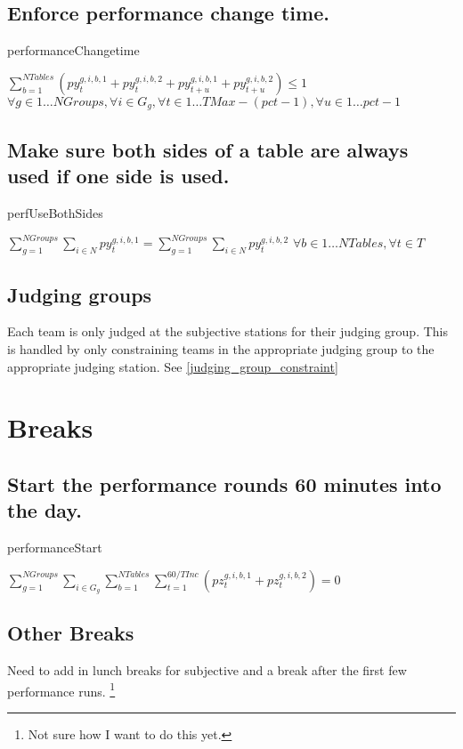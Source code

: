 \documentclass[letterpaper,11pt]{report}
\newcommand{\doccomment}[3]%
{\marginpar{\textcolor{#2}{\bf #1}}%
\footnote{{\color{#2}#3}}%
}
\newcommand{\doccomment}[3]{}
\newcommand{\jpscomment}[1]%
{\doccomment{SCHEWE}{Bittersweet}{#1}}
\begin{document}
\FloatBarrier
\subsection{Enforce performance change time.}
\begin{algorithm}
\caption{performanceChangetime}
$
\sum\limits_{b=1}^{NTables} (
py_{t}^{g,i,b,1} + py_{t}^{g,i,b,2}
+
py_{t+u}^{g,i,b,1} + py_{t+u}^{g,i,b,2})
\le 1$
\hfill $
\forall g \in 1 \dots NGroups,
\forall i \in G_{g}, 
\forall t \in 1 \dots TMax - (pct - 1),
\forall u \in 1 \dots pct-1$
\end{algorithm}

\FloatBarrier
\subsection{Make sure both sides of a table are always used if one side is
  used.}
\begin{algorithm}
\caption{perfUseBothSides}
$\sum\limits_{g=1}^{NGroups}\sum\limits_{i \in N} py_{t}^{g,i,b,1} 
= 
\sum\limits_{g=1}^{NGroups}\sum\limits_{i \in N}py_{t}^{g,i,b,2}$
\hfill $
\forall b \in 1 \dots NTables,
\forall t \in T$
\end{algorithm}


\FloatBarrier
\subsection{Judging groups}
Each team is only judged at the subjective stations for their judging
group. This is handled by only constraining teams in the appropriate
judging group to the appropriate judging station. See \autoref{judging_group_constraint}


\FloatBarrier
\section{Breaks}
\subsection{Start the performance rounds 60 minutes into the day.}
\begin{algorithm}
\caption{performanceStart}
$
\sum\limits_{g=1}^{NGroups}
\sum\limits_{i \in G_{g}} 
  \sum\limits_{b=1}^{NTables} 
    \sum\limits_{t = 1}^{60/TInc} 
      ( pz_{t}^{g,i,b,1} + pz_{t}^{g,i,b,2} ) = 0$
\end{algorithm}
    
\subsection{Other Breaks}
Need to add in lunch breaks for subjective and a break after the first few
performance runs. \jpscomment{Not sure how I want to do this yet.}
\end{document}

